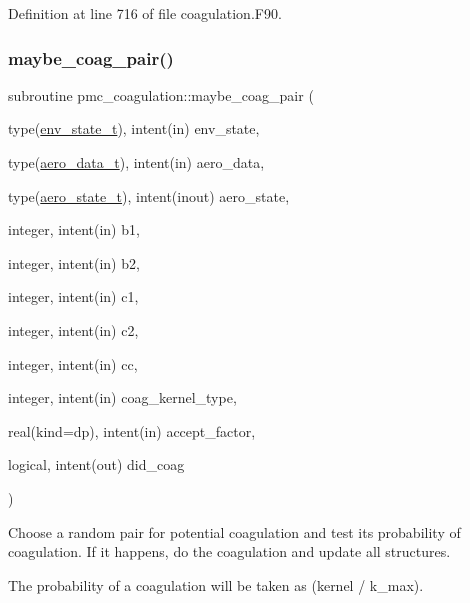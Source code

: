 Definition at line 716 of file coagulation.\+F90.

\mbox{\label{namespacepmc__coagulation_a25340bbe4cbc91edfe95036aa4732cbb}} 
\subsubsection{\texorpdfstring{maybe\+\_\+coag\+\_\+pair()}{maybe\_coag\_pair()}}
{\footnotesize\ttfamily subroutine pmc\+\_\+coagulation\+::maybe\+\_\+coag\+\_\+pair (\begin{DoxyParamCaption}\item[{type(\mbox{\hyperlink{structpmc__env__state_1_1env__state__t}{env\+\_\+state\+\_\+t}}), intent(in)}]{env\+\_\+state,  }\item[{type(\mbox{\hyperlink{structpmc__aero__data_1_1aero__data__t}{aero\+\_\+data\+\_\+t}}), intent(in)}]{aero\+\_\+data,  }\item[{type(\mbox{\hyperlink{structpmc__aero__state_1_1aero__state__t}{aero\+\_\+state\+\_\+t}}), intent(inout)}]{aero\+\_\+state,  }\item[{integer, intent(in)}]{b1,  }\item[{integer, intent(in)}]{b2,  }\item[{integer, intent(in)}]{c1,  }\item[{integer, intent(in)}]{c2,  }\item[{integer, intent(in)}]{cc,  }\item[{integer, intent(in)}]{coag\+\_\+kernel\+\_\+type,  }\item[{real(kind=dp), intent(in)}]{accept\+\_\+factor,  }\item[{logical, intent(out)}]{did\+\_\+coag }\end{DoxyParamCaption})}



Choose a random pair for potential coagulation and test its probability of coagulation. If it happens, do the coagulation and update all structures. 

The probability of a coagulation will be taken as {\ttfamily (kernel / k\+\_\+max)}.


